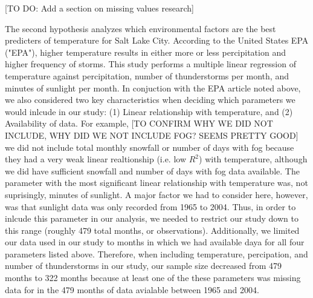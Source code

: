 [TO DO: Add a section on missing values research]

The second hypothesis analyzes which environmental factors are the best predicters of temperature for Salt Lake City. According to the United States EPA ("EPA")\cite{epa_utah}, higher temperature results in either more or less percipitation and higher frequency of storms. This study performs a multiple linear regression of temperature against percipitation, number of thunderstorms per month, and minutes of sunlight per month. In conjuction with the EPA article noted above, we also considered two key characteristics when deciding which parameters we would inlcude in our study: (1) Linear relationship with temperature, and (2) Availability of data. For example, [TO CONFIRM WHY WE DID NOT INCLUDE, WHY DID WE NOT INCLUDE FOG? SEEMS PRETTY GOOD] we did not include total monthly snowfall or number of days with fog because they had a very weak linear realtionship (i.e. low $R^{2}$) with temperature, although we did have sufficient snowfall and number of days with fog data available. The parameter with the most significant linear relationship with temperature was, not suprisingly, minutes of sunlight. A major factor we had to consider here, however, was that sunlight data was only recorded from 1965 to 2004. Thus, in order to inlcude this parameter in our analysis, we needed to restrict our study down to this range (roughly 479 total months, or observations). Additionally, we limited our data used in our study to months in which we had available daya for all four parameters listed above. Therefore, when including temperature, percipation, and number of thunderstorms in our study, our sample size decreased from 479 months to 322 months because at least one of the these parameters was missing data for in the 479 months of data avialable between 1965 and 2004.

